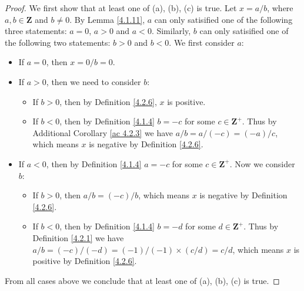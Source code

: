 \begin{proof}
    We first show that at least one of (a), (b), (c) is true.
    Let \(x = a / b\), where \(a, b \in \mathbf{Z}\) and \(b \neq 0\).
    By Lemma \ref{4.1.11}, \(a\) can only satisified one of the following three statements:
    \(a = 0\), \(a > 0\) and \(a < 0\).
    Similarly, \(b\) can only satisified one of the following two statements:
    \(b > 0\) and \(b < 0\).
    We first consider \(a\):
    \begin{itemize}
        \item If \(a = 0\), then \(x = 0 / b = 0\).
        \item If \(a > 0\), then we need to consider \(b\):
              \begin{itemize}
                  \item If \(b > 0\), then by Definition \ref{4.2.6}, \(x\) is positive.
                  \item If \(b < 0\), then by Definition \ref{4.1.4} \(b = -c\) for some \(c \in \mathbf{Z}^+\).
                        Thus by Additional Corollary \ref{ac 4.2.3} we have \(a / b = a / (-c) = (-a) / c\), which means \(x\) is negative by Definition \ref{4.2.6}.
              \end{itemize}
        \item If \(a < 0\), then by Definition \ref{4.1.4} \(a = -c\) for some \(c \in \mathbf{Z}^+\).
              Now we consider \(b\):
              \begin{itemize}
                  \item If \(b > 0\), then \(a / b = (-c) / b\), which means \(x\) is negative by Definition \ref{4.2.6}.
                  \item If \(b < 0\), then by Definition \ref{4.1.4} \(b = -d\) for some \(d \in \mathbf{Z}^+\).
                        Thus by Definition \ref{4.2.1} we have \(a / b = (-c) / (-d) = (-1) / (-1) \times (c / d) = c / d\), which means \(x\) is positive by Definition \ref{4.2.6}.
              \end{itemize}
    \end{itemize}
    From all cases above we conclude that at least one of (a), (b), (c) is true.


\end{proof}
